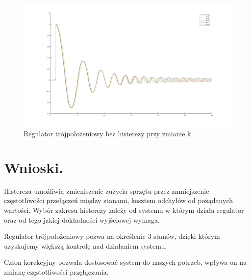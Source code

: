 \documentclass[a4paper,10pt]{article}
\begin{document}
\begin{enumerate}
\begin{figure}[!h]
    \centering
	\includegraphics[width=120mm]{troj_kor_k_bez.png}
	\caption{Regulator trójpołożeniowy bez histerezy przy zmianie k}
    \label{fig:Rysunek}
\end{figure}

\end{enumerate}
\newpage
\newpage
\section{Wnioski.}\label{sec:wnioski}
Histereza umożliwia zmieniszenie zużycia sprzętu przez zmniejszenie częstotliwości przełączeń między stanami, kosztem odchyłów od pożądanych wartości. Wybór zakresu histerezy zależy od systemu w którym działa regulator oraz od tego jakiej dokładności wyjściowej wymaga.

Regulator trójpołożeniowy pozwa na określenie 3 stanów, dzięki którym uzyskujemy większą kontrolę nad działaniem systemu.

Człon korekcyjny pozwala dostosować system do naszych potrzeb, wpływa on na zmianę częstotliwości przęłączania.
\end{document}
